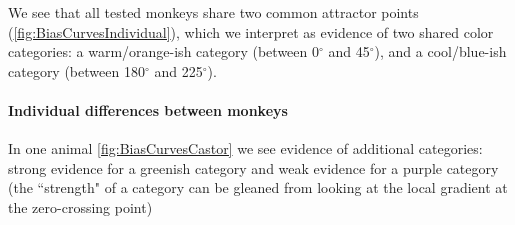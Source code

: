 We see that all tested monkeys share two common attractor points (\autoref{fig:BiasCurvesIndividual}), which we interpret as evidence of two shared color categories: a warm/orange-ish category (between 0$^\circ$ and 45$^\circ$), and a cool/blue-ish category (between 180$^\circ$ and 225$^\circ$). 

\paragraph{Individual differences between monkeys}

In one animal \autoref{fig:BiasCurvesCastor} we see evidence of additional categories: strong evidence for a greenish category and weak evidence for a purple category (the ``strength" of a category can be gleaned from looking at the local gradient at the zero-crossing point)

